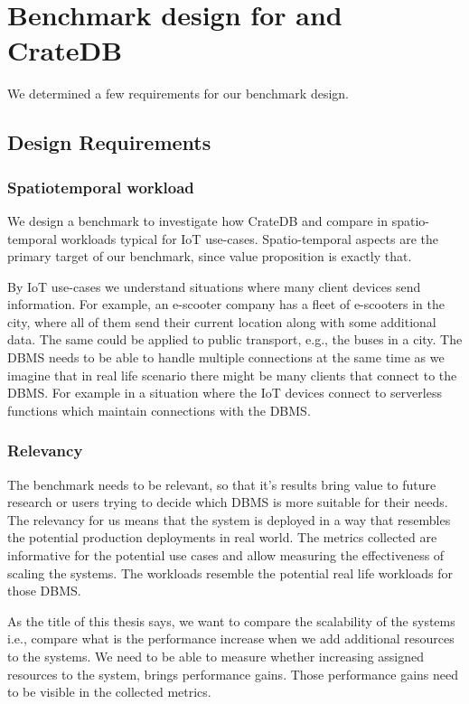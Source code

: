 \section{Benchmark design for \mobilitydbc and CrateDB}
\label{cha:benchmarkdesign}

We determined a few requirements for our benchmark design.
\subsection{Design Requirements}

\subsubsection{Spatiotemporal workload}
\label{req:spatiotemporal-workload}
We design a benchmark to investigate how CrateDB and \mobilitydbc compare in spatio-temporal workloads typical for IoT use-cases.
Spatio-temporal aspects are the primary target of our benchmark, since \mobilitydbc value proposition is exactly that.

By IoT use-cases we understand situations where many client devices send information.
For example, an e-scooter company has a fleet of e-scooters in the city, where all of them send their current location along with some additional data.
The same could be applied to public transport, e.g., the buses in a city.
The DBMS needs to be able to handle multiple connections at the same time as we imagine that in real life scenario there might be many clients that connect to the DBMS.
For example in a situation where the IoT devices connect to serverless functions which maintain connections with the DBMS.

\subsubsection{Relevancy}
\label{req:relevancy}

The benchmark needs to be relevant, so that it's results bring value to future research or users trying to decide which DBMS is more suitable for their needs.
The relevancy for us means that the system is deployed in a way that resembles the potential production deployments in real world.
The metrics collected are informative for the potential use cases and allow measuring the effectiveness of scaling the systems.
The workloads resemble the potential real life workloads for those DBMS.

As the title of this thesis says, we want to compare the scalability of the systems i.e., compare what is the performance increase when we add additional resources to the systems. We need to be able to measure whether increasing assigned resources to the system, brings performance gains.
Those performance gains need to be visible in the collected metrics. 

